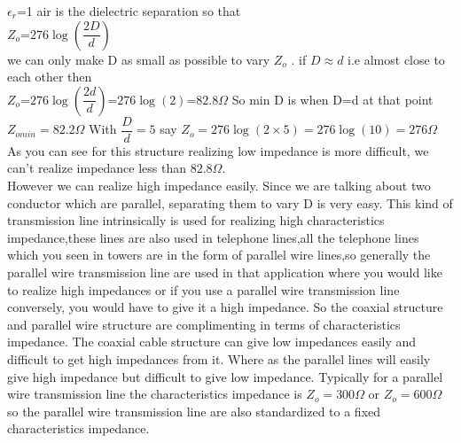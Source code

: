 $\epsilon_r$=1 air is the dielectric separation so that \\
$Z_o$=$276\log(\dfrac{2D}{d})$\\
we can only make D as small as possible to vary $Z_o$ . if $D\approx d$ i.e almost close to each other then\\
 $Z_o$=$276\log(\dfrac{2d}{d})$=$276\log(2)$=$82.8\Omega$
So min D is when D=d at that point $Z_{omin}=82.2\Omega$
With $\dfrac{D}{d}=5$ say $Z_o=276\log(2\times5)=276\log(10)=276\Omega$\\
As you can see for this structure realizing low impedance is more difficult, we can't realize impedance less than $82.8\Omega$.\\
 However we can realize high impedance easily. Since we are talking about two conductor which are parallel, separating them to vary D is very easy.
This kind of transmission line intrinsically is used for realizing high characteristics impedance,these lines are also used in telephone lines,all the telephone lines which you seen in towers are in the form of parallel wire lines,so generally the parallel wire transmission line are used in that application where you would like to realize high impedances or if you use a parallel wire transmission line conversely, you would have to give it a high impedance. So the coaxial structure and parallel wire structure are complimenting in terms of characteristics impedance. The coaxial cable structure can give low impedances easily and difficult to get high impedances from it. Where as the parallel lines will easily give high impedance but difficult to give low impedance. Typically for a parallel wire transmission line the characteristics impedance is $Z_o=300\Omega$ or $Z_o=600\Omega$ so the parallel wire transmission line are also standardized to a fixed characteristics impedance.
